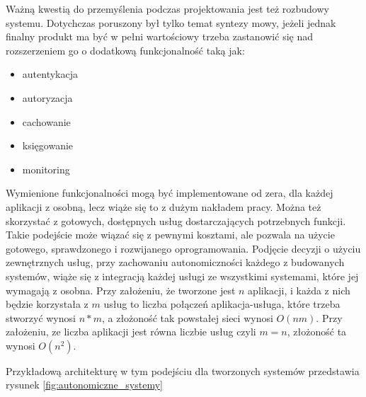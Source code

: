 Ważną kwestią do przemyślenia podczas projektowania jest też rozbudowy systemu. Dotychczas poruszony był tylko temat syntezy mowy, jeżeli  jednak finalny produkt ma być w pełni wartościowy trzeba zastanowić się nad rozszerzeniem go o dodatkową funkcjonalność taką jak:

\label{list:uslugi}
\begin{itemize}
	\item autentykacja
	\item autoryzacja
	\item cachowanie
	\item księgowanie
	\item monitoring
\end{itemize}


Wymienione funkcjonalności mogą być implementowane od zera, dla każdej aplikacji z osobną, lecz wiąże się to z dużym nakładem pracy. Można też skorzystać z gotowych, dostępnych usług dostarczających potrzebnych funkcji. Takie podejście może wiązać się z pewnymi kosztami, ale pozwala na użycie gotowego, sprawdzonego i rozwijanego oprogramowania. Podjęcie decyzji o użyciu zewnętrznych usług, przy zachowaniu autonomiczności każdego z budowanych systemów, wiąże się z integracją każdej usługi ze wszystkimi systemami, które jej wymagają z osobna. Przy założeniu, że tworzone jest \begin{math}n\end{math} aplikacji, i każda z nich będzie korzystała z \begin{math}m\end{math} usług to liczba połączeń aplikacja-usługa, które trzeba stworzyć wynosi  \begin{math}n*m\end{math}, a złożoność tak powstałej sieci wynosi \begin{math}O(nm)\end{math}. Przy założeniu, ze liczba aplikacji jest równa liczbie usług czyli \begin{math}m = n\end{math}, złożoność ta wynosi \begin{math}O(n^2)\end{math}.

 Przykładową architekturę w tym podejściu dla tworzonych systemów przedstawia rysunek \ref{fig:autonomiczne_systemy}

